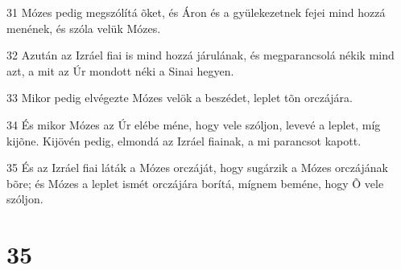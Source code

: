 \par 31 Mózes pedig megszólítá õket, és Áron és a gyülekezetnek fejei mind hozzá menének, és szóla velük Mózes.
\par 32 Azután az Izráel fiai is mind hozzá járulának, és megparancsolá nékik mind azt, a mit az Úr mondott néki a Sinai hegyen.
\par 33 Mikor pedig elvégezte Mózes velök a beszédet, leplet tõn orczájára.
\par 34 És mikor Mózes az Úr elébe méne, hogy vele szóljon, levevé a leplet, míg kijõne. Kijövén pedig, elmondá az Izráel fiainak, a mi parancsot kapott.
\par 35 És az Izráel fiai láták a Mózes orczáját, hogy sugárzik a Mózes orczájának bõre; és Mózes a leplet ismét orczájára borítá, mígnem beméne, hogy Õ vele szóljon.

\chapter{35}

